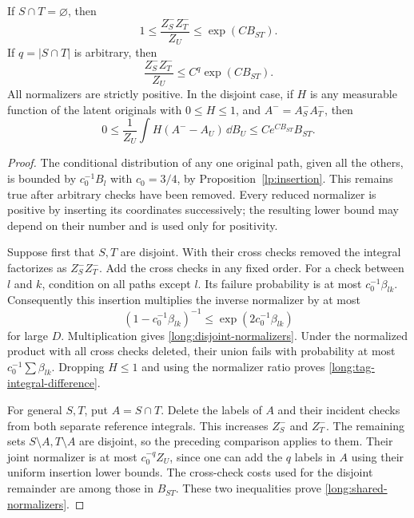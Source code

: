 \begin{lemma}\label{long:normalizers}
If $S\cap T=\varnothing$, then
\begin{equation}\label{long:disjoint-normalizers}
       1\le\frac{Z_S^-Z_T^-}{Z_U}
                    \le \exp(CB_{ST}).
\end{equation}
If $q=|S\cap T|$ is arbitrary, then
\begin{equation}\label{long:shared-normalizers}
       \frac{Z_S^-Z_T^-}{Z_U}
                    \le C^q\exp(CB_{ST}).
\end{equation}
All normalizers are strictly positive.  In the disjoint case, if $H$ is
any measurable function of the latent originals with $0\le H\le1$, and
$A^- = A_S^- A_T^-$, then
\begin{equation}\label{long:tag-integral-difference}
 0\le \frac1{Z_U}\int H(A^- - A_U)\,\dd B_U
                       \le C e^{CB_{ST}} B_{ST}.
\end{equation}
\end{lemma}
\begin{proof}
The conditional distribution of any one original path, given all the
others, is bounded by $c_0^{-1}B_l$ with $c_0=3/4$, by
Proposition~\ref{lp:insertion}.  This remains true after arbitrary checks have
been removed.  Every reduced normalizer is positive by inserting its
coordinates successively; the resulting lower bound may depend on their
number and is used only for positivity.

Suppose first that $S,T$ are disjoint.  With their cross checks removed the
integral factorizes as $Z_S^-Z_T^-$.  Add the cross checks in any fixed
order.  For a check between $l$ and $k$, condition on all paths except
$l$.  Its failure probability is at most $c_0^{-1}\beta_{lk}$.
Consequently this insertion multiplies the inverse normalizer by at most
\[
 (1-c_0^{-1}\beta_{lk})^{-1}
                         \le \exp(2c_0^{-1}\beta_{lk})
\]
for large $D$.  Multiplication gives
\eqref{long:disjoint-normalizers}.  Under the normalized product with all
cross checks deleted, their union fails with probability at most
$c_0^{-1}\sum\beta_{lk}$.  Dropping $H\le1$ and using the normalizer
ratio proves \eqref{long:tag-integral-difference}.

For general $S,T$, put $A=S\cap T$.  Delete the labels of $A$ and their
incident checks from both separate reference integrals.  This increases
$Z_S^-$ and $Z_T^-$.  The remaining sets $S\setminus A,T\setminus A$
are disjoint, so the preceding comparison applies to them.  Their joint
normalizer is at most $c_0^{-q}Z_U$, since one can add the $q$ labels in
$A$ using their uniform insertion lower bounds.  The cross-check costs
used for the disjoint remainder are among those in $B_{ST}$.  These two
inequalities prove \eqref{long:shared-normalizers}.
\end{proof}

